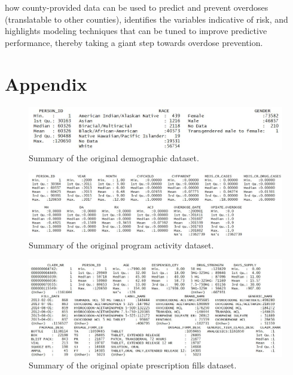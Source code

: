 \documentclass[twoside,10.5pt]{article}
\begin{document}
how county-provided data can be used to predict and prevent overdoses (translatable to other counties), identifies the variables indicative of risk, and highlights modeling techniques that can be tuned to improve predictive performance, thereby taking a giant step towards overdose prevention. 

\newpage
\appendix
\section*{Appendix}

\begin{figure}[h!]
\begin{center}
\includegraphics[width=5in]{images/original_dem_summary.JPG}
\end{center}
\caption{Summary of the original demographic dataset.}
\label{fig:orig_dem}
\end{figure}

\begin{figure}[h!]
\begin{center}
\includegraphics[width=6in]{images/original_prog_summary.JPG}
\end{center}
\caption{Summary of the original program activity dataset.}
\label{fig:orig_prog}
\end{figure}

\begin{figure}[h!]
\begin{center}
\includegraphics[width=6in]{images/original_presc_summary.JPG}
\end{center}
\caption{Summary of the original opiate prescription fills dataset.}
\label{fig:orig_presc}
\end{figure}

\newpage
\theendnotes


\end{document}
